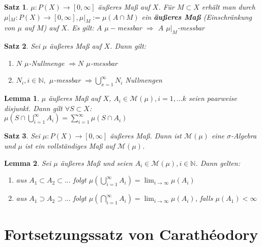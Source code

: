 \documentclass[11pt]{memoir}
\theoremstyle{changebreak}
\newtheorem{Lemma}{Lemma}[chapter]
\newtheorem{Satz}{Satz}[chapter]
\begin{document}
\begin{Satz}
$\mu: P(X) \rightarrow [0, \infty]$ äußeres Maß auf $X$. Für $M \subset X$ erhält man durch $\mu|_M : P(X) \rightarrow [0, \infty], \mu|_M := \mu(A \cap M)$ ein \textbf{äußeres Maß} (Einschränkung von $\mu$ auf $M$) auf $X$. Es gilt: $A$ $ \mu-$messbar $\Rightarrow$  $A$ $ \mu|_M $-messbar
\end{Satz}

\begin{Satz}
Sei $\mu$ äußeres Maß auf $X$. Dann gilt:
\begin{enumerate}
	\item $N$ $\mu$-Nullmenge $\Rightarrow N$ $\mu$-messbar
	\item $N_i, i \in \mathbb N,$ $\mu$-messbar $\Rightarrow \bigcup\limits_{x=1}^\infty N_i$ Nullmengen
\end{enumerate}
\end{Satz}


\begin{Lemma}
$\mu$ äußeres Maß auf $X$, $A_i \in \mathscr M(\mu), i = 1, ... k$ seien paarweise disjunkt. Dann gilt $\forall S \subset X$: \\
$\mu\left(S \cap \bigcup\limits_{i=1}^\infty A_i\right) = \sum\limits_{i=1}^\infty \mu(S \cap A_i)$
\end{Lemma}

\begin{Satz}
Sei $\mu: P(X) \rightarrow [0, \infty]$ äußeres Maß. Dann ist $\mathscr M(\mu)$ eine $\sigma$-Algebra und $\mu$ ist ein vollständiges Maß auf $\mathscr M(\mu)$.
\end{Satz}

\begin{Lemma}
Sei $\mu$ äußeres Maß und seien $A_i \in \mathscr M(\mu), i \in \mathbb N$. Dann gelten:
\begin{enumerate}
	\item aus $A_1 \subset A_2 \subset ...$ folgt $\mu\left(\bigcup\limits_{i=1}^\infty A_i\right) = \lim_{i \rightarrow \infty} \mu(A_i)$
	\item aus $A_1 \supset A_2 \supset ...$ folgt $\mu\left(\bigcap\limits_{i=1}^\infty A_i\right) = \lim_{i \rightarrow \infty} \mu(A_i)$, falls $\mu(A_1) \less \infty$
\end{enumerate}
\end{Lemma}


\section{Fortsetzungssatz von Carathéodory}
\end{document}
